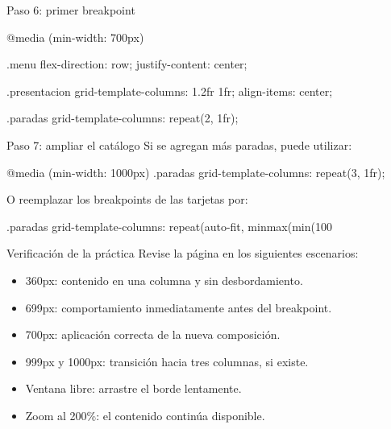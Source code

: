 \documentclass[aspectratio=169,11pt]{beamer}
\begin{document}
    \begin{frame}[fragile]{Paso 6: primer breakpoint}
        \begin{csscodedark}
            @media (min-width: 700px) {
                .menu {
                    flex-direction: row;
                    justify-content: center;
                }

                .presentacion {
                    grid-template-columns: 1.2fr 1fr;
                    align-items: center;
                }

                .paradas {
                    grid-template-columns: repeat(2, 1fr);
                }
            }
        \end{csscodedark}
    \end{frame}

    \begin{frame}[fragile]{Paso 7: ampliar el catálogo}
        Si se agregan más paradas, puede utilizar:

        \begin{csscodedark}
            @media (min-width: 1000px) {
                .paradas {
                    grid-template-columns: repeat(3, 1fr);
                }
            }
        \end{csscodedark}

        O reemplazar los breakpoints de las tarjetas por:

        \begin{csscodedark}
            .paradas {
                grid-template-columns:
                repeat(auto-fit, minmax(min(100%
            }
        \end{csscodedark}
    \end{frame}

    \begin{frame}{Verificación de la práctica}
        Revise la página en los siguientes escenarios:

        \begin{itemize}
            \item 360px: contenido en una columna y sin desbordamiento.
            \item 699px: comportamiento inmediatamente antes del breakpoint.
            \item 700px: aplicación correcta de la nueva composición.
            \item 999px y 1000px: transición hacia tres columnas, si existe.
            \item Ventana libre: arrastre el borde lentamente.
            \item Zoom al 200\%: el contenido continúa disponible.
        \end{itemize}

    \end{frame}
\end{document}
